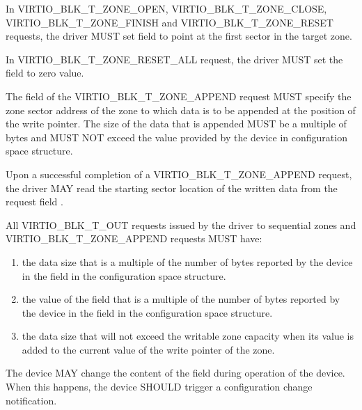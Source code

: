 In VIRTIO_BLK_T_ZONE_OPEN, VIRTIO_BLK_T_ZONE_CLOSE, VIRTIO_BLK_T_ZONE_FINISH and
VIRTIO_BLK_T_ZONE_RESET requests, the driver MUST set  field to
point at the first sector in the target zone.

In VIRTIO_BLK_T_ZONE_RESET_ALL request, the driver MUST set the field
 to zero value.

The  field of the VIRTIO_BLK_T_ZONE_APPEND request MUST specify
the zone sector address of the zone to which data is to be appended at the
position of the write pointer. The size of the data that is appended MUST be a
multiple of  bytes and MUST NOT exceed the
 value provided by the device in
 configuration space structure.

Upon a successful completion of a VIRTIO_BLK_T_ZONE_APPEND request, the driver
MAY read the starting sector location of the written data from the request
field .

All VIRTIO_BLK_T_OUT requests issued by the driver to sequential zones and
VIRTIO_BLK_T_ZONE_APPEND requests MUST have:

\begin{enumerate}
\item the data size that is a multiple of the number of bytes reported
    by the device in the field  in the
     configuration space structure.

\item the value of the field  that is a multiple of the number of
    bytes reported by the device in the field  in the
     configuration space structure.

\item the data size that will not exceed the writable zone capacity when its
    value is added to the current value of the write pointer of the zone.

\end{enumerate}


The device MAY change the content of the  field during
operation of the device. When this happens, the device SHOULD trigger a
configuration change notification.

